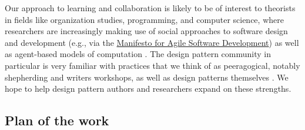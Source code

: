 


Our approach to learning and collaboration is likely to be of interest to theorists in fields like organization studies, programming, and computer science, where researchers are increasingly making use of social approaches to software design and development (e.g., via the \href{http://www.agilemanifesto.org/}{Manifesto for Agile Software Development}) as well as agent-based models of computation \cite{minsky1967programming,poetry-workshop}.
%
The design pattern community in particular is very familiar with practices that we think of as peeragogical, notably shepherding and writers workshops, as well as design patterns themselves \cite{harrison1999language,coplien1997pattern,meszaros1998pattern}.  We hope to help design pattern authors and researchers expand on these strengths.

\subsection*{Plan of the work}


